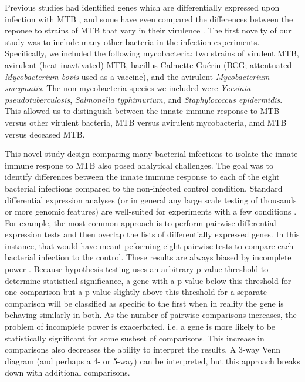 Previous studies had identified genes which are differentially
expressed upon infection with MTB \citep{Ehrt2001, Ragno2001, Nau2002,
  Chaussabel2003, Volpe2006, Tailleux2008}, and some have even
compared the differences between the reponse to strains of MTB that
vary in their virulence \citep{Coscolla2010, Wu2012}. The first
novelty of our study was to include many other bacteria in the
infection experiments. Specifically, we included the following
mycobacteria: two strains of virulent MTB, avirulent
(heat-inavtivated) MTB, bacillus Calmette-Gu\'{e}rin (BCG; attentuated
\emph{Mycobacterium bovis} used as a vaccine), and the avirulent
\emph{Mycobacterium smegmatis}. The non-mycobacteria species we
included were \emph{Yersinia pseudotuberculosis}, \emph{Salmonella
  typhimurium}, and \emph{Staphylococcus epidermidis}. This allowed us
to distinguish between the innate immune response to MTB versus other
virulent bacteria, MTB versus avirulent mycobacteria, amd MTB versus
deceased MTB.

This novel study design comparing many bacterial infections to isolate
the innate immune respone to MTB also posed analytical challenges. The
goal was to identify differences between the innate immune response to
each of the eight bacterial infections compared to the non-infected
control condition.  Standard differential expression analyses (or in
general any large scale testing of thousands or more genomic features)
are well-suited for experiments with a few conditions
\citep{Oshlack2010, Anders2013, Ritchie2015}. For example, the most
common approach is to perform pairwise differential expression tests
and then overlap the lists of differentially expressed genes. In this
instance, that would have meant peforming eight pairwise tests to
compare each bacterial infection to the control.  These results are
always biased by incomplete power \citep{Ding2010,
  Flutre2013}. Because hypothesis testing uses an arbitrary p-value
threshold to determine statistical significance, a gene with a p-value
below this threshold for one comparison but a p-value slightly above
this threshold for a separate comparison will be classified as
specific to the first when in reality the gene is behaving similarly
in both. As the number of pairwise comparisons increases, the problem
of incomplete power is exacerbated, i.e. a gene is more likely to be
statistically significant for some susbset of comparisons. This
increase in comparisons also decreases the ability to interpret the
results. A 3-way Venn diagram (and perhaps a 4- or 5-way) can be
interpreted, but this approach breaks down with additional
comparisons.

